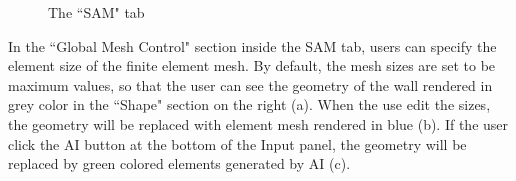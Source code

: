 \begin{figure}[!htbp]
  \caption{The ``SAM" tab}
  \label{fig:sam}
\end{figure}




In the ``Global Mesh Control" section inside the SAM tab, users can specify the element size of the finite element mesh. 
By default, the mesh sizes are set to be maximum values, so that the user can see the geometry of the wall rendered in grey color in the ``Shape" section on the right   (a). 
When the use edit the sizes, the geometry will be replaced with element mesh rendered in blue  (b). 
If the user click the AI button at the bottom of the Input panel, the geometry will be replaced by green colored elements generated by AI  (c).

